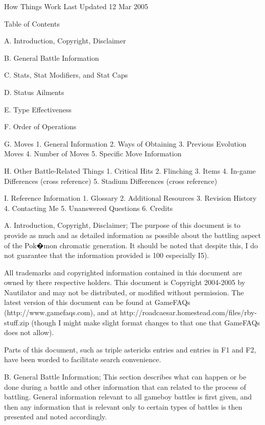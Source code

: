 \documentclass[reprint, aps, prl, paper=A4]{revtex4-1}
\begin{document}
How Things Work
Last Updated 12 Mar 2005


Table of Contents

A. Introduction, Copyright, Disclaimer

B. General Battle Information

C. Stats, Stat Modifiers, and Stat Caps

D. Status Ailments

E. Type Effectiveness

F. Order of Operations

G. Moves
     1. General Information
     2. Ways of Obtaining
     3. Previous Evolution Moves
     4. Number of Moves
     5. Specific Move Information

H. Other Battle-Related Things
     1. Critical Hits
     2. Flinching
     3. Items
     4. In-game Differences (cross reference)
     5. Stadium Differences (cross reference)

I. Reference Information
     1. Glossary
     2. Additional Resources
     3. Revision History
     4. Contacting Me
     5. Unanswered Questions
     6. Credits



A. Introduction, Copyright, Disclaimer;
The purpose of this document is to provide as much and as detailed information as possible
about the battling aspect of the Pok�mon chromatic generation. It should be noted that despite
this, I do not guarantee that the information provided is 100%
especially I5).

All trademarks and copyrighted information contained in this document are owned by there
respective holders. This document is Copyright 2004-2005 by Nautilator and may not be
distributed, or modified without permission. The latest version of this document can be found
at GameFAQs (http://www.gamefaqs.com), and at
http://roadcaesar.homestead.com/files/rby-stuff.zip (though I might make slight format changes
to that one that GameFAQs does not allow).

Parts of this document, such as triple astericks entries and entries in F1 and F2, have been
worded to facilitate search convenience.



B. General Battle Information;
This section describes what can happen or be done during a battle and other information that
can related to the process of battling. General information relevant to all gameboy battles is
first given, and then any information that is relevant only to certain types of battles is
then presented and noted accordingly.
\end{document}
